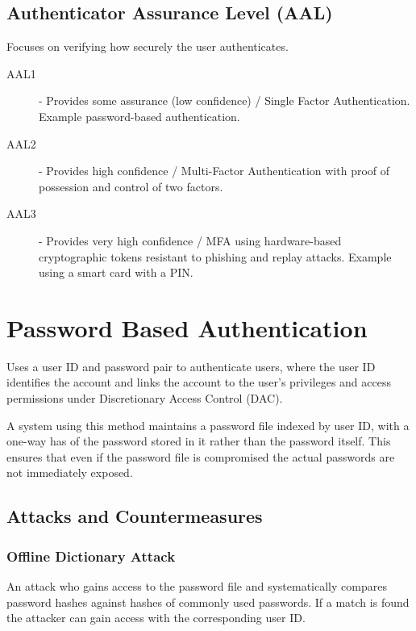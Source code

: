 \documentclass[12pt letter]{report}
\begin{document}
\subsection{Authenticator Assurance Level (AAL)}
Focuses on verifying how securely the user authenticates.
\begin{description}
  \item[AAL1]  - Provides some assurance (low confidence) / Single
    Factor Authentication.
    Example password-based authentication.
  \item[AAL2] - Provides high confidence / Multi-Factor
    Authentication with proof of possession and control of two factors.
  \item[AAL3] - Provides very high confidence / MFA using
    hardware-based cryptographic tokens resistant to phishing and
    replay attacks. Example using a smart card with a PIN.
\end{description}

\section{Password Based Authentication}


Uses a user ID and password pair to authenticate users, where the
user ID identifies the account and links the account to the user's
privileges and access permissions under Discretionary Access Control (DAC).

A system using this method maintains a password file indexed by user
ID, with a one-way has of the password stored in it rather than the
password itself. This ensures that even if the password file is
compromised the actual passwords are not immediately exposed.

\subsection{Attacks and Countermeasures}

\subsubsection{Offline Dictionary Attack}

An attack who gains access to the password file and systematically
compares password hashes against hashes of commonly used passwords.
If a match is found the attacker can gain access with the corresponding user ID.
\end{document}

